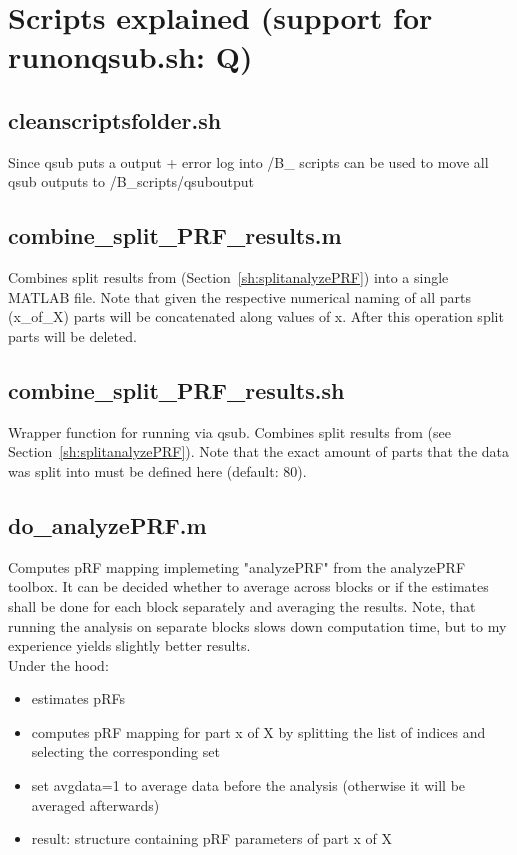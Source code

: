 \documentclass[12pt,a4paper]{scrartcl}
\begin{document}
\section{Scripts explained (support for runonqsub.sh: Q)}
\label{sec:scriptsExplained}
\subsection{cleanscriptsfolder.sh}
\label{sh:clean}
Since qsub puts a output + error log into /B\_ scripts \texttt{} can be used to move all qsub outputs to /B\_scripts/qsuboutput\\

\subsection{combine\_split\_PRF\_results.m}
\label{m:combsplt}
Combines split results from \texttt{} (Section~\ref{sh:splitanalyzePRF}) into a single MATLAB file. Note that given the respective numerical naming of all parts (x\_of\_X) parts will be concatenated along values of x. After this operation split parts will be deleted.\\

\subsection{combine\_split\_PRF\_results.sh}
\label{sh:combsplt}
Wrapper function for running \texttt{} via qsub. Combines split results from \texttt{} (see Section~\ref{sh:splitanalyzePRF}). Note that the exact amount of parts that the data was split into must be defined here (default: 80).\\

\subsection{do\_analyzePRF.m}
\label{m:analyzePRF}
Computes pRF mapping implemeting "analyzePRF" from the analyzePRF toolbox. It can be decided whether to average across blocks or if the estimates shall be done for each block separately and averaging the results. Note, that running the analysis on separate blocks slows down computation time, but to my experience yields slightly better results.\\

\noindent Under the hood:
\begin{itemize}
\item estimates pRFs
\item computes pRF mapping for part x of X by splitting the list of indices and selecting the corresponding set
\item set avgdata=1 to average data before the analysis (otherwise it will be averaged afterwards)
\item result: structure containing pRF parameters of part x of X
\end{itemize}
\end{document}
